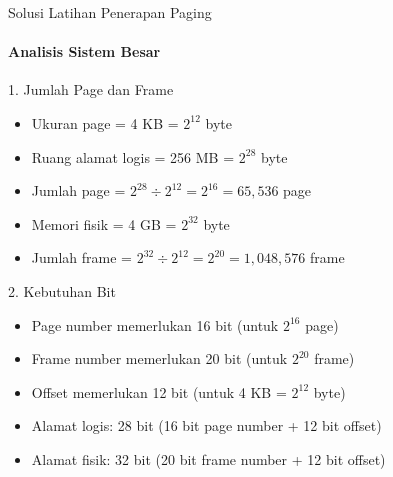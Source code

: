 \documentclass[10pt,aspectratio=169]{beamer}
\begin{document}
\begin{frame}{Solusi Latihan Penerapan Paging}
    \framesubtitle{Analisis Sistem Besar}
    
    \begin{block}{1. Jumlah Page dan Frame}
        \begin{itemize}
            \item Ukuran page = 4 KB = $2^{12}$ byte
            \item Ruang alamat logis = 256 MB = $2^{28}$ byte
            \item Jumlah page = $2^{28} \div 2^{12} = 2^{16} = 65,536$ page
            \item Memori fisik = 4 GB = $2^{32}$ byte
            \item Jumlah frame = $2^{32} \div 2^{12} = 2^{20} = 1,048,576$ frame
        \end{itemize}
    \end{block}
    
    \begin{alertblock}{2. Kebutuhan Bit}
        \begin{itemize}
            \item Page number memerlukan 16 bit (untuk $2^{16}$ page)
            \item Frame number memerlukan 20 bit (untuk $2^{20}$ frame)
            \item Offset memerlukan 12 bit (untuk 4 KB = $2^{12}$ byte)
            \item Alamat logis: 28 bit (16 bit page number + 12 bit offset)
            \item Alamat fisik: 32 bit (20 bit frame number + 12 bit offset)
        \end{itemize}
    \end{alertblock}
\end{frame}
\end{document}
